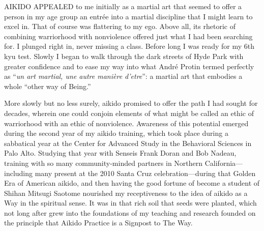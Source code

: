 {\uppercase{Aikido appealed}} to me initially as a martial art that seemed to offer a person in my age group an entr\'{e}e into a martial discipline that I might learn to excel in. That of course was flattering to my ego. Above all, its rhetoric of combining warriorhood with nonviolence offered just what I had been searching for. I plunged right in, never missing a class. Before long I was ready for my 6th kyu test. Slowly I began to walk through the dark streets of Hyde Park with greater confidence and to ease my way into what André Protin termed perfectly as ``\emph{un art martial, une autre mani\`{e}re d'etre}'': a martial art that embodies a whole ``other way of Being.''

More slowly but no less surely, aikido promised to offer the path I had sought for decades, wherein one could conjoin elements of what might be called an ethic of warriorhood with an ethic of nonviolence. Awareness of this potential emerged during the second year of my aikido training, which took place during a sabbatical year at the Center for Advanced Study in the Behavioral Sciences in Palo Alto. Studying that year with Senseis Frank Doran and Bob Nadeau, training with so many community-minded partners in Northern California---including many present at the 2010 Santa Cruz celebration---during that Golden Era of American aikido, and then having the good fortune of become a student of Shihan Mitsugi Saotome nourished my receptiveness to the idea of aikido as a Way in the spiritual sense. It was in that rich soil that seeds were planted, which not long after grew into the foundations of my teaching and research founded on the principle that Aikido Practice is a Signpost to The Way.